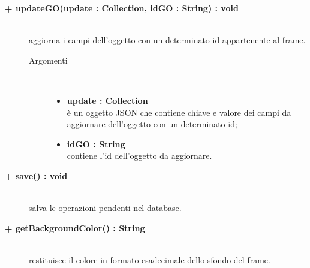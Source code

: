 \begin{description}
\begin{description}
\begin{description}
\begin{description}
\end{description}

\end{description}

\begin{description}
		\item[\textbf{\color{blue}+ updateGO(update : Collection, idGO : String) : void			}] \hfill \\
			aggiorna i campi dell'oggetto con un determinato id appartenente al frame.  

\begin{description}
			\item[Argomenti] \hfill \\
				\begin{itemize}
						\item \textbf{update : Collection			} \hfill \\
					è un oggetto JSON che contiene chiave e valore dei campi da aggiornare dell'oggetto con un determinato id;
					\item \textbf{idGO : String			} \hfill \\
					contiene l'id dell'oggetto da aggiornare.
				\end{itemize}

\end{description}

\end{description}

\begin{description} %
		\item[\textbf{\color{blue}+ save() : void			}] \hfill \\
			salva le operazioni pendenti nel database.  

\end{description}

\begin{description} %
		\item[\textbf{\color{blue}+ getBackgroundColor() : String			}] \hfill \\
			restituisce il colore in formato esadecimale dello sfondo del frame.     

\end{description}



\end{description}

\end{description}



